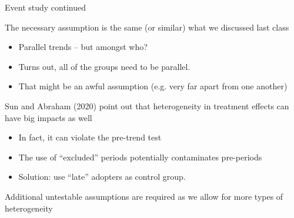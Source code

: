 \documentclass[notes,11pt, aspectratio=169]{beamer}
\newenvironment{wideitemize}{\itemize\addtolength{\itemsep}{10pt}}{\enditemize}
\begin{document}
\begin{frame}{Event study continued}
  \begin{wideitemize}
  \item The necessary assumption is the same (or similar) what we discussed last class
    \begin{itemize}
    \item Parallel trends -- but amongst who?
    \item Turns out, all of the groups need to be parallel.
    \item That might be an awful assumption (e.g. very far apart from
      one another)
    \end{itemize}
  \item Sun and Abraham (2020) point out that heterogeneity in
    treatment effects can have big impacts as well
    \begin{itemize}
    \item In fact, it can violate the pre-trend test
    \item The use of ``excluded'' periods potentially contaminates pre-periods
    \item Solution: use ``late'' adopters as control group. 
    \end{itemize}
    \item Additional untestable assumptions are required as we allow for more types of heterogeneity
  \end{wideitemize}
\end{frame}
\end{document}
